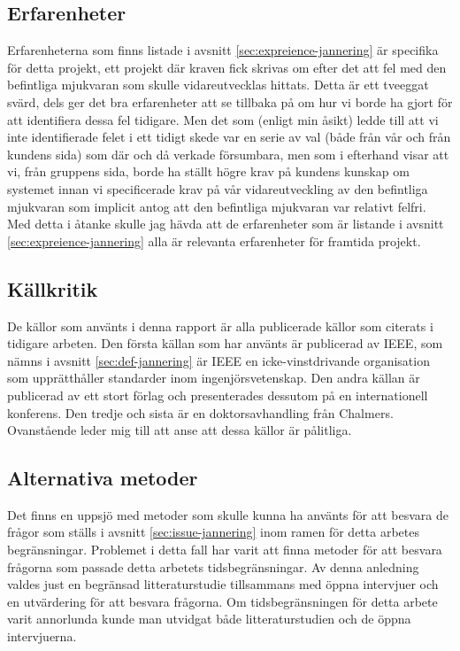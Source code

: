 \subsection{Erfarenheter}
Erfarenheterna som finns listade i avsnitt \ref{sec:expreience-jannering} är specifika för detta projekt, ett projekt där kraven fick skrivas om efter det att fel med den befintliga mjukvaran som skulle vidareutvecklas hittats. Detta är ett tveeggat svärd, dels ger det bra erfarenheter att se tillbaka på om hur vi borde ha gjort för att identifiera dessa fel tidigare. Men det som (enligt min åsikt) ledde till att vi inte identifierade felet i ett tidigt skede var en serie av val (både från vår och från kundens sida) som där och då verkade försumbara, men som i efterhand visar att vi, från gruppens sida, borde ha ställt högre krav på kundens kunskap om systemet innan vi specificerade krav på vår vidareutveckling av den befintliga mjukvaran som implicit antog att den befintliga mjukvaran var relativt felfri. Med detta i åtanke skulle jag hävda att de erfarenheter som är listande i avsnitt \ref{sec:expreience-jannering} alla är relevanta erfarenheter för framtida projekt.      
\subsection{Källkritik}
De källor som använts i denna rapport är alla publicerade källor som citerats i tidigare arbeten. Den första källan som har använts är publicerad av IEEE, som nämns i avsnitt \ref{sec:def-jannering} är IEEE en icke-vinstdrivande organisation som upprätthåller standarder inom ingenjörsvetenskap. Den andra källan är publicerad av ett stort förlag och presenterades dessutom på en internationell konferens. Den tredje och sista är en doktorsavhandling från Chalmers. Ovanstående leder mig till att anse att dessa källor är pålitliga.      
\subsection{Alternativa metoder}
Det finns en uppsjö  med metoder som skulle kunna ha använts för att besvara de frågor som ställs i avsnitt \ref{sec:issue-jannering} inom ramen för detta arbetes begränsningar. Problemet i detta fall har varit att finna metoder för att besvara frågorna som passade detta arbetets tidsbegränsningar. Av denna anledning valdes just en begränsad litteraturstudie tillsammans med öppna intervjuer och en utvärdering för att besvara frågorna. Om tidsbegränsningen för detta arbete varit annorlunda kunde man utvidgat både litteraturstudien och de öppna intervjuerna.   
